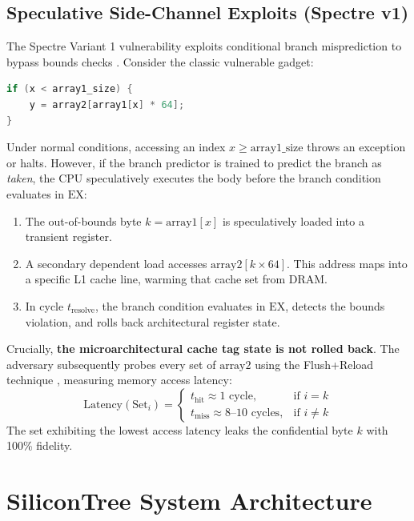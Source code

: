\documentclass[journal,twocolumn,10pt]{IEEEtran}
\begin{document}
\subsection{Speculative Side-Channel Exploits (Spectre v1)}
The Spectre Variant 1 vulnerability exploits conditional branch misprediction to bypass bounds checks \cite{kocher2019}. Consider the classic vulnerable gadget:
\begin{lstlisting}[language=C]
if (x < array1_size) {
    y = array2[array1[x] * 64];
}
\end{lstlisting}

Under normal conditions, accessing an index $x \ge \text{array1\_size}$ throws an exception or halts. However, if the branch predictor is trained to predict the branch as \textit{taken}, the CPU speculatively executes the body before the branch condition evaluates in $\text{EX}$:
\begin{enumerate}
    \item The out-of-bounds byte $k = \text{array1}[x]$ is speculatively loaded into a transient register.
    \item A secondary dependent load accesses $\text{array2}[k \times 64]$. This address maps into a specific L1 cache line, warming that cache set from DRAM.
    \item In cycle $t_{\text{resolve}}$, the branch condition evaluates in $\text{EX}$, detects the bounds violation, and rolls back architectural register state.
\end{enumerate}

Crucially, \textbf{the microarchitectural cache tag state is not rolled back}. The adversary subsequently probes every set of $\text{array2}$ using the Flush+Reload technique \cite{yarom2014}, measuring memory access latency:
\begin{equation}
\text{Latency}(\text{Set}_i) = \begin{cases} 
t_{\text{hit}} \approx 1 \text{ cycle}, & \text{if } i = k \\
t_{\text{miss}} \approx 8\text{--}10 \text{ cycles}, & \text{if } i \neq k 
\end{cases}
\end{equation}
The set exhibiting the lowest access latency leaks the confidential byte $k$ with 100\% fidelity.

\section{SiliconTree System Architecture}
\end{document}
